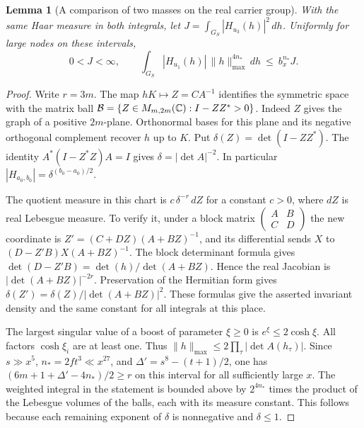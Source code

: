 \documentclass[a4paper,11pt]{article}
\newtheorem{lemma}[proposition]{Lemma}
\theoremstyle{definition}
\theoremstyle{remark}
\numberwithin{equation}{section}
\begin{document}
\begin{lemma}[A comparison of two masses on the real carrier group]
\leavevmode\label{lem:carrierweightmass815}
With the same Haar measure in both integrals, let
\(J=\int_{G_S}|H_{u_3}(h)|^2\,dh\). Uniformly for large
nodes on these intervals,
\[
       0<J<\infty,\qquad
       \int_{G_S}|H_{u_1}(h)|\,\|h\|_{\max}^{4n_*}\,dh
                   \ \le\ b_x^{n_*}J .
\]
\end{lemma}
\begin{proof}
Write \(r=3m\). The map \(hK\mapsto Z=CA^{-1}\) identifies
the symmetric space with the matrix ball
\(\mathcal B=\{Z\in M_{m,2m}(\mathbb C):I-ZZ^*>0\}\).
Indeed \(Z\) gives the graph of a positive \(2m\)-plane.
Orthonormal bases for this plane and its negative orthogonal
complement recover \(h\) up to \(K\). Put
\(\delta(Z)=\det(I-ZZ^*)\). The identity
\(A^*(I-Z^*Z)A=I\) gives
\(\delta=|\det A|^{-2}\). In particular
\(|H_{a_0,b_0}|=\delta^{(b_0-a_0)/2}\).

The quotient measure in this chart is
\(c\,\delta^{-r}\,dZ\) for a constant \(c>0\), where \(dZ\)
is real Lebesgue measure. To verify it, under a block matrix
\(\left(\begin{smallmatrix}A&B\\ C&D\end{smallmatrix}\right)\)
the new coordinate is \(Z'=(C+DZ)(A+BZ)^{-1}\), and its
differential sends \(X\) to \((D-Z'B)X(A+BZ)^{-1}\).
The block determinant formula gives
\(\det(D-Z'B)=\det(h)/\det(A+BZ)\).
Hence the real Jacobian is \(|\det(A+BZ)|^{-2r}\).
Preservation of the Hermitian form gives
\(\delta(Z')=\delta(Z)/|\det(A+BZ)|^2\).
These formulas give the asserted invariant density and the
same constant for all integrals at this place.

The largest singular value of a boost of parameter
\(\xi\ge0\) is \(e^\xi\le2\cosh\xi\). All factors
\(\cosh\xi_i\) are at least one. Thus
\(\|h\|_{\max}\le2\prod_\tau|\det A(h_\tau)|\).
Since \(s\gg x^5\), \(n_*=2ft^3\ll x^{27}\), and
\(\Delta'=s^8-(t+1)/2\), one has
\((6m+1+\Delta'-4n_*)/2\ge r\) on this interval for
all sufficiently large \(x\). The weighted integral in the
statement is bounded above by \(2^{4n_*}\) times the
product of the Lebesgue volumes of the balls, each with
its measure constant. This follows because each remaining
exponent of \(\delta\) is nonnegative and \(\delta\le1\).


\end{proof}
\end{document}
